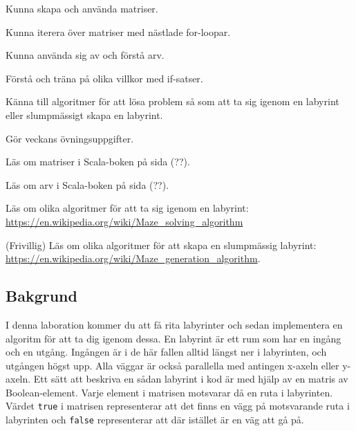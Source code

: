 
\Lab{\LabWeekNINE}

\begin{Goals}
\item Kunna skapa och använda matriser.
\item Kunna iterera över matriser med nästlade for-loopar.
\item Kunna använda sig av och förstå arv.
\item Förstå och träna på olika villkor med if-satser.
\item Känna till algoritmer för att lösa problem så som att ta sig igenom en labyrint eller slumpmässigt skapa en labyrint.
\end{Goals}

\begin{Preparations}
\item Gör veckans övningsuppgifter.
\item Läs om matriser i Scala-boken på sida (??).
\item Läs om arv i Scala-boken på sida (??).
\item Läs om olika algoritmer för att ta sig igenom en labyrint: \url{https://en.wikipedia.org/wiki/Maze\_solving\_algorithm}
\item (Frivillig) Läs om olika algoritmer för att skapa en slumpmässig labyrint: \url{https://en.wikipedia.org/wiki/Maze\_generation\_algorithm}.
\end{Preparations}

\subsection{Bakgrund}

I denna laboration kommer du att få rita labyrinter och sedan implementera en algoritm för att ta dig igenom dessa. En labyrint är ett rum som har en ingång och en utgång. Ingången är i de här fallen alltid längst ner i labyrinten, och utgången högst upp. Alla väggar är också parallella med antingen x-axeln eller y-axeln. Ett sätt att beskriva en sådan labyrint i kod är med hjälp av en matris av Boolean-element. Varje element i matrisen motsvarar då en ruta i labyrinten. Värdet \texttt{true} i matrisen representerar att det finns en vägg på motsvarande ruta i labyrinten och \texttt{false} representerar att där istället är en väg att gå på.


